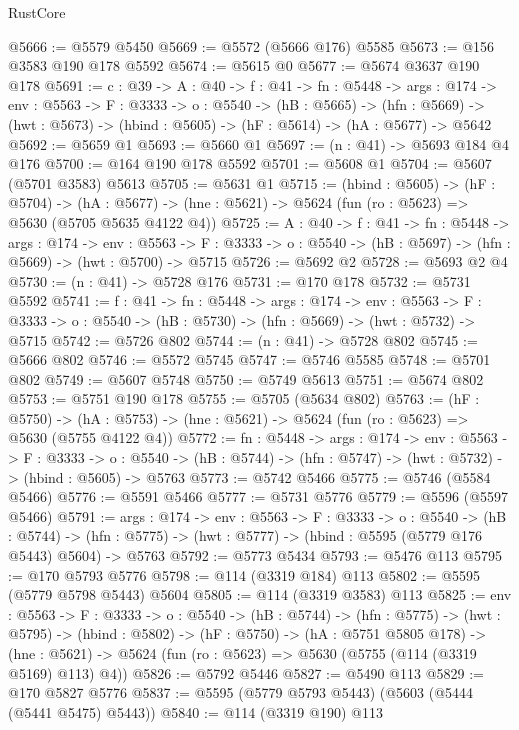 \begin{lexlean}{RustCore}
\begin{coremodule}
@5666 := @5579 @5450
@5669 := @5572 (@5666 @176) @5585
@5673 := @156 @3583 @190 @178 @5592
@5674 := @5615 @0
@5677 := @5674 @3637 @190 @178
@5691 := {c : @39} ->
  {A : @40} ->
  {f : @41} ->
  {fn : @5448} ->
  {args : @174} ->
  {env : @5563} ->
  {F : @3333} ->
  {o : @5540} ->
  (hB : @5665) ->
  (hfn : @5669) -> (hwt : @5673) -> (hbind : @5605) -> (hF : @5614) -> (hA : @5677) -> @5642
@5692 := @5659 @1
@5693 := @5660 @1
@5697 := (n : @41) -> @5693 @184 @4 @176
@5700 := @164 @190 @178 @5592
@5701 := @5608 @1
@5704 := @5607 (@5701 @3583) @5613
@5705 := @5631 @1
@5715 := (hbind : @5605) ->
  (hF : @5704) ->
  (hA : @5677) -> (hne : @5621) -> @5624 (fun (ro : @5623) => @5630 (@5705 @5635 @4122 @4))
@5725 := {A : @40} ->
  {f : @41} ->
  {fn : @5448} ->
  {args : @174} ->
  {env : @5563} ->
  {F : @3333} -> {o : @5540} -> (hB : @5697) -> (hfn : @5669) -> (hwt : @5700) -> @5715
@5726 := @5692 @2
@5728 := @5693 @2 @4
@5730 := (n : @41) -> @5728 @176
@5731 := @170 @178
@5732 := @5731 @5592
@5741 := {f : @41} ->
  {fn : @5448} ->
  {args : @174} ->
  {env : @5563} ->
  {F : @3333} -> {o : @5540} -> (hB : @5730) -> (hfn : @5669) -> (hwt : @5732) -> @5715
@5742 := @5726 @802
@5744 := (n : @41) -> @5728 @802
@5745 := @5666 @802
@5746 := @5572 @5745
@5747 := @5746 @5585
@5748 := @5701 @802
@5749 := @5607 @5748
@5750 := @5749 @5613
@5751 := @5674 @802
@5753 := @5751 @190 @178
@5755 := @5705 (@5634 @802)
@5763 := (hF : @5750) ->
  (hA : @5753) -> (hne : @5621) -> @5624 (fun (ro : @5623) => @5630 (@5755 @4122 @4))
@5772 := {fn : @5448} ->
  {args : @174} ->
  {env : @5563} ->
  {F : @3333} ->
  {o : @5540} -> (hB : @5744) -> (hfn : @5747) -> (hwt : @5732) -> (hbind : @5605) -> @5763
@5773 := @5742 @5466
@5775 := @5746 (@5584 @5466)
@5776 := @5591 @5466
@5777 := @5731 @5776
@5779 := @5596 (@5597 @5466)
@5791 := {args : @174} ->
  {env : @5563} ->
  {F : @3333} ->
  {o : @5540} ->
  (hB : @5744) ->
  (hfn : @5775) -> (hwt : @5777) -> (hbind : @5595 (@5779 @176 @5443) @5604) -> @5763
@5792 := @5773 @5434
@5793 := @5476 @113
@5795 := @170 @5793 @5776
@5798 := @114 (@3319 @184) @113
@5802 := @5595 (@5779 @5798 @5443) @5604
@5805 := @114 (@3319 @3583) @113
@5825 := {env : @5563} ->
  {F : @3333} ->
  {o : @5540} ->
  (hB : @5744) ->
  (hfn : @5775) ->
  (hwt : @5795) ->
  (hbind : @5802) ->
  (hF : @5750) ->
  (hA : @5751 @5805 @178) ->
  (hne : @5621) -> @5624 (fun (ro : @5623) => @5630 (@5755 (@114 (@3319 @5169) @113) @4))
@5826 := @5792 @5446
@5827 := @5490 @113
@5829 := @170 @5827 @5776
@5837 := @5595 (@5779 @5793 @5443) (@5603 (@5444 (@5441 @5475) @5443))
@5840 := @114 (@3319 @190) @113

\end{coremodule}
\end{lexlean}
